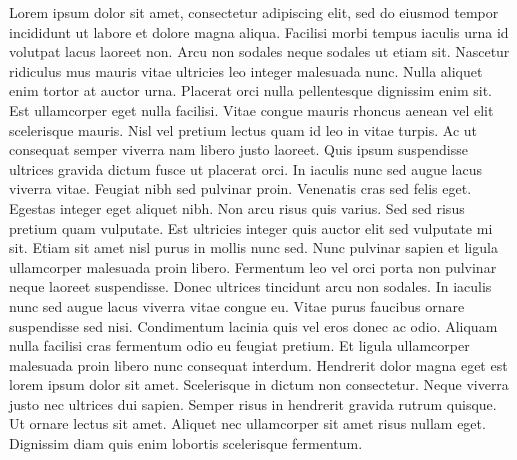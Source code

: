 Lorem ipsum dolor sit amet, consectetur adipiscing elit, sed do eiusmod tempor incididunt ut labore et dolore magna aliqua. Facilisi morbi tempus iaculis urna id volutpat lacus laoreet non. Arcu non sodales neque sodales ut etiam sit. Nascetur ridiculus mus mauris vitae ultricies leo integer malesuada nunc. Nulla aliquet enim tortor at auctor urna. Placerat orci nulla pellentesque dignissim enim sit. Est ullamcorper eget nulla facilisi. Vitae congue mauris rhoncus aenean vel elit scelerisque mauris. Nisl vel pretium lectus quam id leo in vitae turpis. Ac ut consequat semper viverra nam libero justo laoreet. Quis ipsum suspendisse ultrices gravida dictum fusce ut placerat orci. In iaculis nunc sed augue lacus viverra vitae. Feugiat nibh sed pulvinar proin. Venenatis cras sed felis eget. Egestas integer eget aliquet nibh. Non arcu risus quis varius. Sed sed risus pretium quam vulputate.
Est ultricies integer quis auctor elit sed vulputate mi sit. Etiam sit amet nisl purus in mollis nunc sed. Nunc pulvinar sapien et ligula ullamcorper malesuada proin libero. Fermentum leo vel orci porta non pulvinar neque laoreet suspendisse. Donec ultrices tincidunt arcu non sodales. In iaculis nunc sed augue lacus viverra vitae congue eu. Vitae purus faucibus ornare suspendisse sed nisi. Condimentum lacinia quis vel eros donec ac odio. Aliquam nulla facilisi cras fermentum odio eu feugiat pretium. Et ligula ullamcorper malesuada proin libero nunc consequat interdum. Hendrerit dolor magna eget est lorem ipsum dolor sit amet. Scelerisque in dictum non consectetur. Neque viverra justo nec ultrices dui sapien. Semper risus in hendrerit gravida rutrum quisque. Ut ornare lectus sit amet. Aliquet nec ullamcorper sit amet risus nullam eget. Dignissim diam quis enim lobortis scelerisque fermentum.

